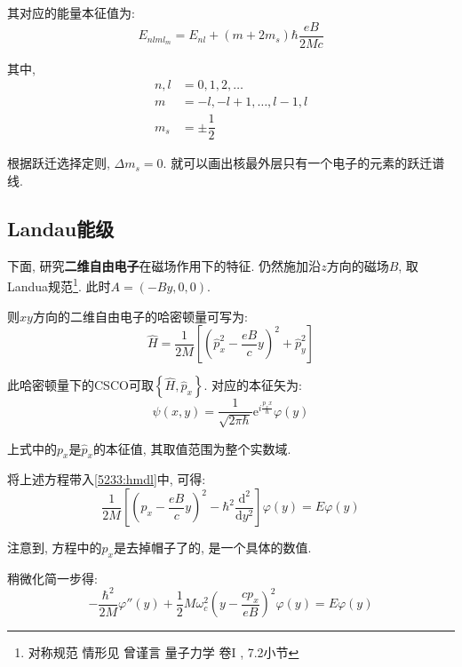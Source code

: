 \documentclass[a4paper, 11pt]{article}
\begin{document}
\begin{spacing}{1.2}
        其对应的能量本征值为:
        \begin{equation}
          E_{nlml_m} = E_{nl}+(m+2m_s)\hbar\dfrac{eB}{2Mc}
        \end{equation}

        其中, 
        \begin{equation*}
          \begin{aligned}
            n,l&=0,1,2,\ldots\\ 
            m &= -l,-l+1,\ldots,l-1,l\\ 
            m_s &= \pm\dfrac{1}{2}
          \end{aligned}
        \end{equation*}

        根据跃迁选择定则, $\Delta{}m_s=0$. 就可以画出核最外层只有一个电子的元素的跃迁谱线.

        
      \subsection{Landau能级}
        下面, 研究\textbf{二维自由电子}在磁场作用下的特征. 仍然施加沿$z$方向的磁场$B$, 取Landua规范\footnote{对称规范
        情形见 曾谨言 量子力学 卷I , 7.2小节}. 此时$A=(-By,0,0)$. 

        则$xy$方向的二维自由电子的哈密顿量可写为:
        \begin{equation}
          \label{5233:hmdl}
          \hat{H} = \dfrac{1}{2M}\left[\left(\hat{p}_x^2-\dfrac{eB}{c}y\right)^2+\hat{p}_y^2\right]
        \end{equation}

        此哈密顿量下的CSCO可取$\left\{\hat{H}, \hat{p}_x\right\}$. 对应的本征矢为:
        \begin{equation}
          \psi(x,y) = \dfrac{1}{\sqrt{2\pi\hbar}}\mathrm{e}^{i\frac{p_xx}{\hbar}}\varphi(y)
        \end{equation}

        上式中的$p_x$是$\hat{p}_x$的本征值, 其取值范围为整个实数域.

        将上述方程带入\eqref{5233:hmdl}中, 可得:
        \begin{equation}
          \dfrac{1}{2M}\left[\left(p_x-\dfrac{eB}{c}y\right)^2-\hbar^2\dfrac{\mathrm{d}^2}{\mathrm{d}y^2}\right]
          \varphi(y) = E\varphi(y)
        \end{equation}
       
        注意到, 方程中的$p_x$是去掉帽子了的, 是一个具体的数值.

        稍微化简一步得:
        \begin{equation}
          -\dfrac{\hbar^2}{2M}\varphi''(y)+\dfrac{1}{2}M\omega_c^2\left(y-\dfrac{cp_x}{eB}\right)^2\varphi(y) = E\varphi(y)
        \end{equation}


\end{spacing}
\end{document}
